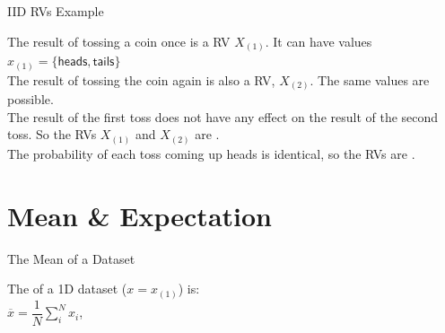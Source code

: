 \documentclass[10pt,sans,english,compress,xcolor=dvipsnames]{beamer}
\begin{document}
\begin{frame}{IID RVs Example}

The result of tossing a coin once is a RV $X_{(1)}$. It can have values $x_{(1)}=\{\mathsf{heads}, \mathsf{tails}\}$\\[1ex]
The result of tossing  the coin again is also a RV, $X_{(2)}$. The same values are possible.\\[1ex]

The result of the first toss does not have any effect on the result of the second toss. So the RVs $X_{(1)}$ and  $X_{(2)}$ are .\\[1ex]

The probability of each toss coming up heads is identical, so the RVs are . \\[1ex]

\end{frame}



\section*{Mean \& Expectation}


\begin{frame}[fragile]{The Mean of a Dataset}

The  of a 1D dataset ($x = x_{(1)}$) is:\\[1ex]
 $\overline{x} = \dfrac{1}{N} \sum\limits_i^N x_i$, \\[1ex]

\\[1ex]


\end{frame}
\end{document}
